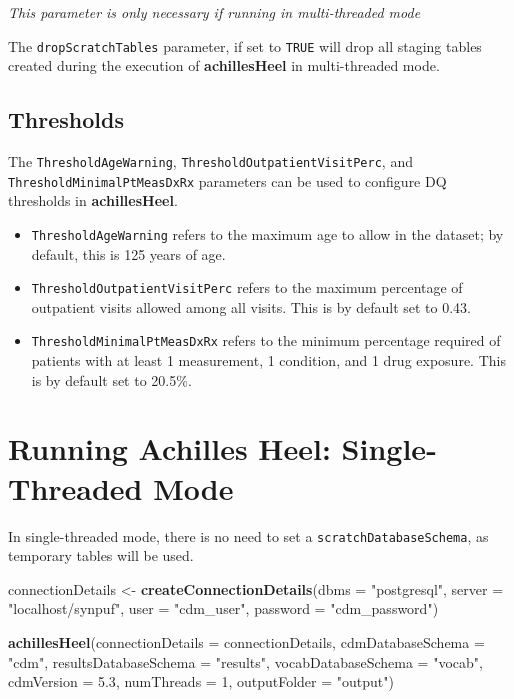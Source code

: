 \documentclass[]{article}
\newenvironment{Shaded}{\begin{snugshade}}{\end{snugshade}}
\newcommand{\KeywordTok}[1]{\textcolor[rgb]{0.13,0.29,0.53}{\textbf{#1}}}
\newcommand{\DataTypeTok}[1]{\textcolor[rgb]{0.13,0.29,0.53}{#1}}
\newcommand{\DecValTok}[1]{\textcolor[rgb]{0.00,0.00,0.81}{#1}}
\newcommand{\FloatTok}[1]{\textcolor[rgb]{0.00,0.00,0.81}{#1}}
\newcommand{\StringTok}[1]{\textcolor[rgb]{0.31,0.60,0.02}{#1}}
\newcommand{\NormalTok}[1]{#1}
\providecommand{\tightlist}{%
  \setlength{\itemsep}{0pt}\setlength{\parskip}{0pt}}
\begin{document}
\emph{This parameter is only necessary if running in multi-threaded
mode}

The \texttt{dropScratchTables} parameter, if set to \texttt{TRUE} will
drop all staging tables created during the execution of
\textbf{achillesHeel} in multi-threaded mode.

\subsection{Thresholds}\label{thresholds}

The \texttt{ThresholdAgeWarning}, \texttt{ThresholdOutpatientVisitPerc},
and \texttt{ThresholdMinimalPtMeasDxRx} parameters can be used to
configure DQ thresholds in \textbf{achillesHeel}.

\begin{itemize}
\tightlist
\item
  \texttt{ThresholdAgeWarning} refers to the maximum age to allow in the
  dataset; by default, this is 125 years of age.
\item
  \texttt{ThresholdOutpatientVisitPerc} refers to the maximum percentage
  of outpatient visits allowed among all visits. This is by default set
  to 0.43.
\item
  \texttt{ThresholdMinimalPtMeasDxRx} refers to the minimum percentage
  required of patients with at least 1 measurement, 1 condition, and 1
  drug exposure. This is by default set to 20.5\%.
\end{itemize}

\section{Running Achilles Heel: Single-Threaded
Mode}\label{running-achilles-heel-single-threaded-mode}

In single-threaded mode, there is no need to set a
\texttt{scratchDatabaseSchema}, as temporary tables will be used.

\begin{Shaded}
\begin{Highlighting}[]
\NormalTok{connectionDetails <-}\StringTok{ }\KeywordTok{createConnectionDetails}\NormalTok{(}\DataTypeTok{dbms =} \StringTok{"postgresql"}\NormalTok{, }
                                             \DataTypeTok{server =} \StringTok{"localhost/synpuf"}\NormalTok{, }
                                             \DataTypeTok{user =} \StringTok{"cdm_user"}\NormalTok{, }
                                             \DataTypeTok{password =} \StringTok{"cdm_password"}\NormalTok{)}

\KeywordTok{achillesHeel}\NormalTok{(}\DataTypeTok{connectionDetails =}\NormalTok{ connectionDetails, }
             \DataTypeTok{cdmDatabaseSchema =} \StringTok{"cdm"}\NormalTok{, }
             \DataTypeTok{resultsDatabaseSchema =} \StringTok{"results"}\NormalTok{, }
             \DataTypeTok{vocabDatabaseSchema =} \StringTok{"vocab"}\NormalTok{, }
             \DataTypeTok{cdmVersion =} \FloatTok{5.3}\NormalTok{, }
             \DataTypeTok{numThreads =} \DecValTok{1}\NormalTok{, }
             \DataTypeTok{outputFolder =} \StringTok{"output"}\NormalTok{)}
\end{Highlighting}
\end{Shaded}
\end{document}

